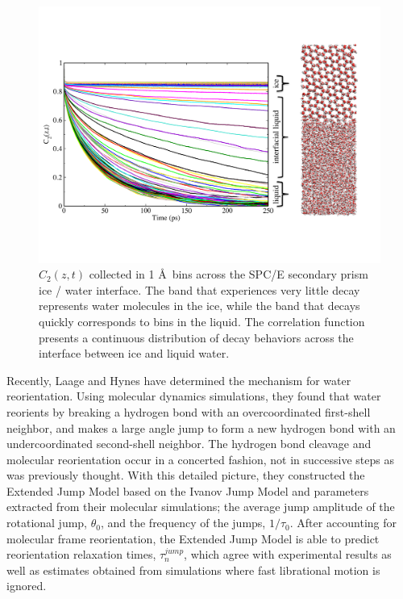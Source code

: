 \begin{figure}
\includegraphics[width=\linewidth]{Figures/CztImage}
\caption{\label{fig:Czt} $C_2(z,t)$ collected in 1 \AA~bins across the SPC/E
  secondary prism ice / water interface. The band that experiences very
  little decay represents water molecules in the ice, while the band
  that decays quickly corresponds to bins in the liquid.  The
  correlation function presents a continuous distribution of decay
  behaviors across the interface between ice and liquid water.}
\end{figure}

Recently, Laage and Hynes have determined the mechanism for water
reorientation.\cite{Laage2006,Laage2008} Using molecular dynamics
simulations, they found that water reorients by breaking a hydrogen
bond with an overcoordinated first-shell neighbor, and makes a large
angle jump to form a new hydrogen bond with an undercoordinated
second-shell neighbor. The hydrogen bond cleavage and molecular
reorientation occur in a concerted fashion, not in successive steps as
was previously thought. With this detailed picture, they constructed
the Extended Jump Model\cite{Laage2006,Laage2008} based on the Ivanov
Jump Model and parameters extracted from their molecular simulations;
the average jump amplitude of the rotational jump, $\theta_{0}$, and
the frequency of the jumps, $1/\tau_{0}$. After accounting for
molecular frame reorientation, the Extended Jump Model is able to
predict reorientation relaxation times, $\tau_{n}^{jump}$, which agree
with experimental results as well as estimates obtained from
simulations where fast librational motion is ignored.

